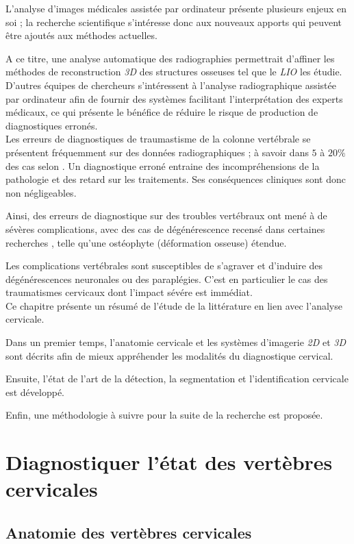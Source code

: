 L'analyse d'images médicales assistée par ordinateur présente plusieurs enjeux en soi ; la recherche scientifique s'intéresse donc aux nouveaux apports qui peuvent être ajoutés aux méthodes actuelles.

A ce titre, une analyse automatique des radiographies permettrait d'affiner les méthodes de reconstruction {\itshape 3D} des structures osseuses tel que le {\itshape LIO} les étudie. D'autres équipes de chercheurs s'intéressent à l'analyse radiographique assistée par ordinateur afin de fournir des systèmes facilitant l'interprétation des experts médicaux, ce qui présente le bénéfice de réduire le risque de production de diagnostiques erronés.
\\

Les erreurs de diagnostiques de traumastisme de la colonne vertébrale se présentent fréquemment sur des données radiographiques ; à savoir dans $5$ à $20\%$ des cas selon \cite{Platzer2006}. Un diagnostique erroné entraine des incompréhensions de la pathologie et des retard sur les traitements. Ses conséquences cliniques sont donc non négligeables.

Ainsi, des erreurs de diagnostique sur des troubles vertébraux ont mené à de sévères complications, avec des cas de dégénérescence recensé dans certaines recherches \cite{Francesco2019, Davis1993}, telle qu'une ostéophyte (déformation osseuse) étendue.

Les complications vertébrales sont susceptibles de s'agraver et d'induire des dégénérescences neuronales ou des paraplégies. C'est en particulier le cas des traumatismes cervicaux dont l'impact sévére est immédiat.
\\

Ce chapitre présente un résumé de l'étude de la littérature en lien avec l'analyse cervicale.

Dans un premier temps, l'anatomie cervicale et les systèmes d'imagerie {\itshape 2D} et {\itshape 3D} sont décrits afin de mieux appréhender les modalités du diagnostique cervical.

Ensuite, l'état de l'art de la détection, la segmentation et l'identification cervicale est développé.

Enfin, une méthodologie à suivre pour la suite de la recherche est proposée.


\section{Diagnostiquer l'état des vertèbres cervicales}
    \subsection{Anatomie des vertèbres cervicales}

